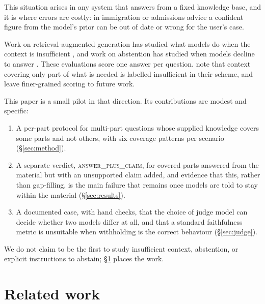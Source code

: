\documentclass[11pt]{article}
\newcommand{\verdict}[1]{\textsc{\MakeLowercase{#1}}}
\begin{document}
This situation arises in any system that answers from a fixed knowledge base, and it is where errors are costly: in immigration or admissions advice a confident figure from the model's prior can be out of date or wrong for the user's case.

Work on retrieval-augmented generation has studied what models do when the context is insufficient \citep{joren2025sufficient,chen2024rgb,ming2024faitheval}, and work on abstention has studied when models decline to answer \citep{wen2024knowyourlimits,kirichenko2025abstentionbench}. These evaluations score one answer per question. \citet{joren2025sufficient} note that context covering only part of what is needed is labelled insufficient in their scheme, and leave finer-grained scoring to future work.

This paper is a small pilot in that direction. Its contributions are modest and specific:
\begin{enumerate}
  \item A per-part protocol for multi-part questions whose supplied knowledge covers some parts and not others, with six coverage patterns per scenario (\S\ref{sec:method}).
  \item A separate verdict, \verdict{ANSWER\_PLUS\_CLAIM}, for covered parts answered from the material but with an unsupported claim added, and evidence that this, rather than gap-filling, is the main failure that remains once models are told to stay within the material (\S\ref{sec:results}).
  \item A documented case, with hand checks, that the choice of judge model can decide whether two models differ at all, and that a standard faithfulness metric is unsuitable when withholding is the correct behaviour (\S\ref{sec:judge}).
\end{enumerate}
We do not claim to be the first to study insufficient context, abstention, or explicit instructions to abstain; \S\ref{sec:related} places the work.

\section{Related work}\label{sec:related}
\end{document}
